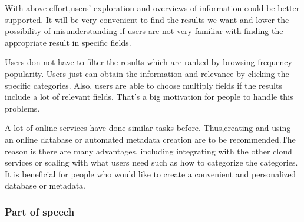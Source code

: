 With above effort,users' exploration and overviews of information could be better supported. 
It will be very convenient to find the results we want and lower the possibility of misunderstanding if users are not very familiar with finding the appropriate result in specific fields.

\cite{TunThuraThet2010} Users don not have to filter the results which are ranked by browsing frequency popularity. 
Users just can obtain the information and relevance by clicking the specific categories. 
Also, users are able to choose multiply fields if the results include a lot of relevant fields. 
That's a big motivation for people to handle this problems. 

A lot of online services have done similar tasks before.
Thus,creating and using an online database or automated metadata creation are to be recommended.The reason is there are many advantages, including integrating with the other cloud services or scaling with what users need such as how to categorize the categories.
It is beneficial for people who would like to create a convenient and personalized database or metadata.\\

\subsubsection*{Part of speech}

